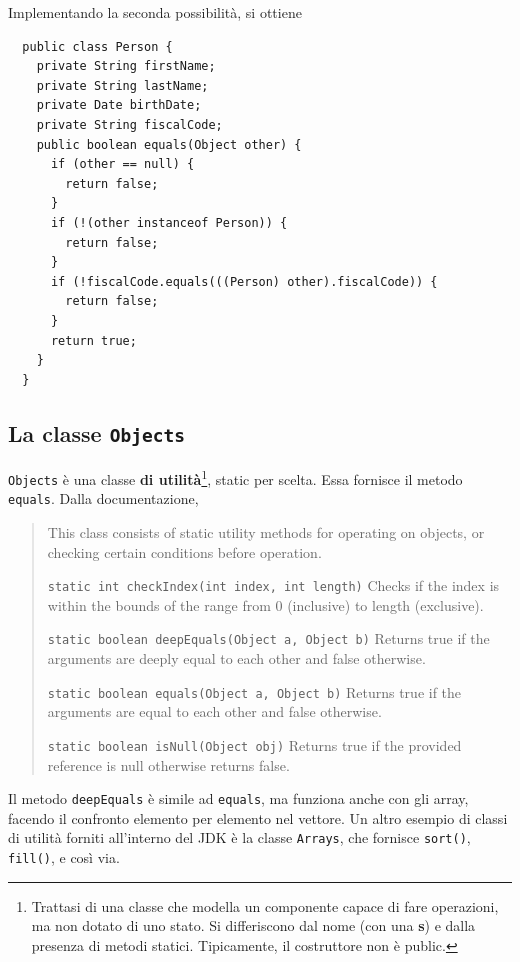 \documentclass[\fontsizeclass,twocolumn]{\classname}
\theoremstyle{definition}
\theoremstyle{definition}
\begin{document}
Implementando la seconda possibilità, si ottiene

\begin{lstlisting}
  public class Person {
    private String firstName;
    private String lastName;
    private Date birthDate;
    private String fiscalCode;
    public boolean equals(Object other) {
      if (other == null) {
        return false;
      }
      if (!(other instanceof Person)) {
        return false;
      }
      if (!fiscalCode.equals(((Person) other).fiscalCode)) {
        return false;
      }
      return true;
    }
  }
\end{lstlisting}

\subsection{La classe \texttt{Objects}}

\texttt{Objects} è una classe \textbf{di utilità}\footnote{Trattasi di una
classe che modella un componente capace di fare operazioni, ma non dotato di
uno stato. Si differiscono dal nome (con una \textbf{s}) e dalla presenza di
metodi statici. Tipicamente, il costruttore non è public.}, static per scelta.
Essa fornisce il metodo \texttt{equals}. Dalla documentazione,


\begin{quote}
    \footnotesize{This class consists of static utility methods for operating on objects, or
    checking certain conditions before operation.

    \texttt{static int 	checkIndex(int index, int length)} 	Checks if the index is within the bounds of the range from 0 (inclusive) to length (exclusive).

    \texttt{static boolean 	deepEquals(Object a, Object b)} 	Returns true if the arguments are deeply equal to each other and false otherwise.

    \texttt{static boolean 	equals(Object a, Object b)} 	Returns true if the arguments are equal to each other and false otherwise.

\texttt{static boolean 	isNull(Object obj)} 	Returns true if the provided reference is null otherwise returns false.}
\end{quote}


Il metodo \texttt{deepEquals} è simile ad \texttt{equals}, ma funziona anche
con gli array, facendo il confronto elemento per elemento nel vettore. Un altro
esempio di classi di utilità forniti all'interno del JDK è la classe
\texttt{Arrays}, che fornisce \texttt{sort()}, \texttt{fill()}, e così via.
\end{document}
